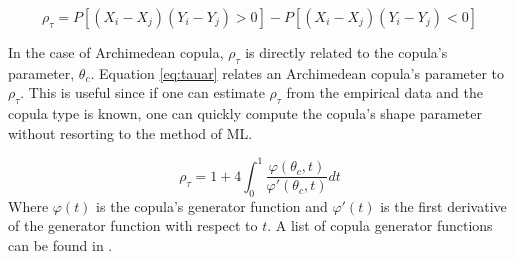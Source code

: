 \begin{equation}
\rho_\tau = P[(X_i - X_j)(Y_i-Y_j)>0] - P[(X_i - X_j)(Y_i - Y_j)<0]
\label{eq:ktau}
\end{equation}

In the case of Archimedean copula, $\rho_\tau$ is directly related to the copula's parameter, $\theta_c$.
Equation \ref{eq:tauar} relates an Archimedean copula's parameter to $\rho_\tau$.  This is useful since if one can estimate $\rho_\tau$ from the empirical data and the copula type is known, one can quickly compute the copula's shape parameter without resorting to the method of ML.

\begin{equation}
\rho_\tau = 1 + 4 \int_0^1 \frac{\varphi(\theta_c,t)}{\varphi'(\theta_c, t)}dt
\label{eq:tauar}
\end{equation}
Where $\varphi(t)$ is the copula's generator function and $\varphi'(t)$ is the first derivative of the generator function with respect to $t$. A list of copula generator functions can be found in \cite{Nelsen2006}. 





